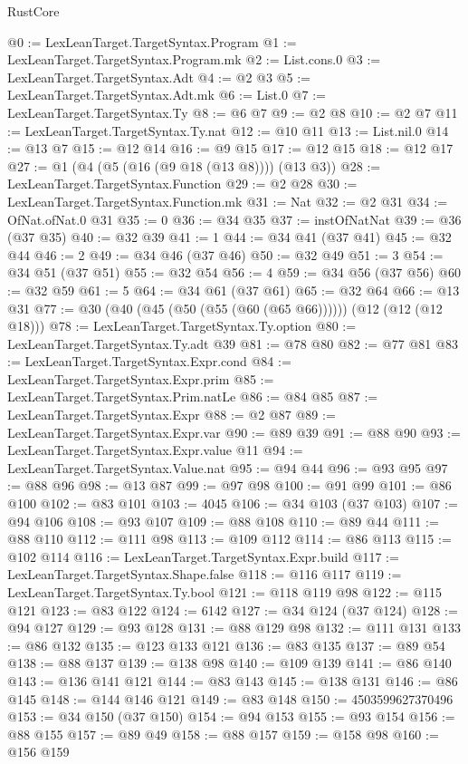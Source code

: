 \begin{lexlean}{RustCore}
\begin{coremodule}
@0 := LexLeanTarget.TargetSyntax.Program
@1 := LexLeanTarget.TargetSyntax.Program.mk
@2 := List.cons.{0}
@3 := LexLeanTarget.TargetSyntax.Adt
@4 := @2 @3
@5 := LexLeanTarget.TargetSyntax.Adt.mk
@6 := List.{0}
@7 := LexLeanTarget.TargetSyntax.Ty
@8 := @6 @7
@9 := @2 @8
@10 := @2 @7
@11 := LexLeanTarget.TargetSyntax.Ty.nat
@12 := @10 @11
@13 := List.nil.{0}
@14 := @13 @7
@15 := @12 @14
@16 := @9 @15
@17 := @12 @15
@18 := @12 @17
@27 := @1 (@4 (@5 (@16 (@9 @18 (@13 @8)))) (@13 @3))
@28 := LexLeanTarget.TargetSyntax.Function
@29 := @2 @28
@30 := LexLeanTarget.TargetSyntax.Function.mk
@31 := Nat
@32 := @2 @31
@34 := OfNat.ofNat.{0} @31
@35 := 0
@36 := @34 @35
@37 := instOfNatNat
@39 := @36 (@37 @35)
@40 := @32 @39
@41 := 1
@44 := @34 @41 (@37 @41)
@45 := @32 @44
@46 := 2
@49 := @34 @46 (@37 @46)
@50 := @32 @49
@51 := 3
@54 := @34 @51 (@37 @51)
@55 := @32 @54
@56 := 4
@59 := @34 @56 (@37 @56)
@60 := @32 @59
@61 := 5
@64 := @34 @61 (@37 @61)
@65 := @32 @64
@66 := @13 @31
@77 := @30 (@40 (@45 (@50 (@55 (@60 (@65 @66)))))) (@12 (@12 (@12 @18)))
@78 := LexLeanTarget.TargetSyntax.Ty.option
@80 := LexLeanTarget.TargetSyntax.Ty.adt @39
@81 := @78 @80
@82 := @77 @81
@83 := LexLeanTarget.TargetSyntax.Expr.cond
@84 := LexLeanTarget.TargetSyntax.Expr.prim
@85 := LexLeanTarget.TargetSyntax.Prim.natLe
@86 := @84 @85
@87 := LexLeanTarget.TargetSyntax.Expr
@88 := @2 @87
@89 := LexLeanTarget.TargetSyntax.Expr.var
@90 := @89 @39
@91 := @88 @90
@93 := LexLeanTarget.TargetSyntax.Expr.value @11
@94 := LexLeanTarget.TargetSyntax.Value.nat
@95 := @94 @44
@96 := @93 @95
@97 := @88 @96
@98 := @13 @87
@99 := @97 @98
@100 := @91 @99
@101 := @86 @100
@102 := @83 @101
@103 := 4045
@106 := @34 @103 (@37 @103)
@107 := @94 @106
@108 := @93 @107
@109 := @88 @108
@110 := @89 @44
@111 := @88 @110
@112 := @111 @98
@113 := @109 @112
@114 := @86 @113
@115 := @102 @114
@116 := LexLeanTarget.TargetSyntax.Expr.build
@117 := LexLeanTarget.TargetSyntax.Shape.false
@118 := @116 @117
@119 := LexLeanTarget.TargetSyntax.Ty.bool
@121 := @118 @119 @98
@122 := @115 @121
@123 := @83 @122
@124 := 6142
@127 := @34 @124 (@37 @124)
@128 := @94 @127
@129 := @93 @128
@131 := @88 @129 @98
@132 := @111 @131
@133 := @86 @132
@135 := @123 @133 @121
@136 := @83 @135
@137 := @89 @54
@138 := @88 @137
@139 := @138 @98
@140 := @109 @139
@141 := @86 @140
@143 := @136 @141 @121
@144 := @83 @143
@145 := @138 @131
@146 := @86 @145
@148 := @144 @146 @121
@149 := @83 @148
@150 := 4503599627370496
@153 := @34 @150 (@37 @150)
@154 := @94 @153
@155 := @93 @154
@156 := @88 @155
@157 := @89 @49
@158 := @88 @157
@159 := @158 @98
@160 := @156 @159

\end{coremodule}
\end{lexlean}
